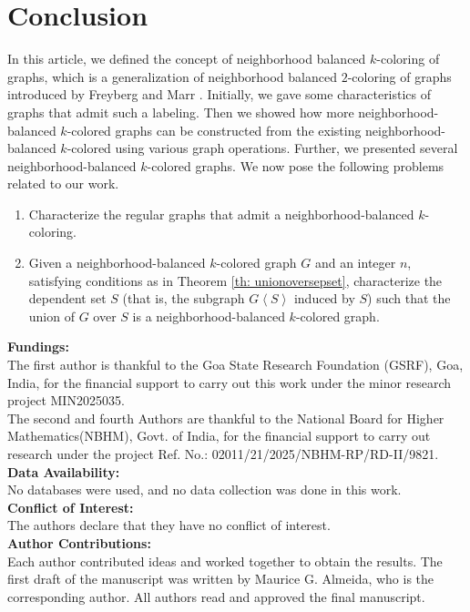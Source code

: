 \documentclass[12pt]{article}
\newcommand{\nbc}{neighborhood-balanced $k$-coloring\xspace}
\newcommand{\nbcd}{neighborhood-balanced $k$-colored\xspace}
\begin{document}
\section{Conclusion}

In this article, we defined the concept of neighborhood balanced $k$-coloring of graphs, which is a generalization of neighborhood balanced $2$-coloring of graphs introduced by Freyberg and Marr \cite{nbc}. Initially, we gave some characteristics of graphs that admit such a labeling. Then we showed how more \nbcd graphs can be constructed from the existing \nbcd using various graph operations. Further, we presented several \nbcd graphs.
We now pose the following problems related to our work.
\begin{enumerate}
    \item Characterize the regular graphs that admit a \nbc.
    \item Given a \nbcd graph $G$ and an integer $n$, satisfying conditions as in Theorem \ref{th: unionoversepset}, characterize the dependent set $S$ (that is, the subgraph $G\left< S \right>$ induced by $S$) such that the union of $G$ over $S$ is a \nbcd graph.
\end{enumerate}

\vspace{1cm}
\noindent \textbf{\large Fundings:}\\
 The first author is thankful to the Goa State Research Foundation (GSRF), Goa, India, for the financial support to carry out this work under the minor research project MIN2025035.\\
The second and fourth Authors are thankful to the National Board for Higher Mathematics(NBHM), Govt. of India, for the financial support to carry out research under the project Ref. No.: 02011/21/2025/NBHM-RP/RD-II/9821.\\

\noindent\textbf{\large Data Availability:}\\
No databases were used, and no data collection was done in this work.\\

\noindent\textbf{\large Conflict of Interest:}\\
The authors declare that they have no conflict of interest.\\

\noindent\textbf{\large Author Contributions:}\\
Each author contributed ideas and worked together to obtain the results. The first draft of the manuscript was written by Maurice G. Almeida, who is the corresponding author. All authors read and approved the final manuscript.




% 





\end{document}
